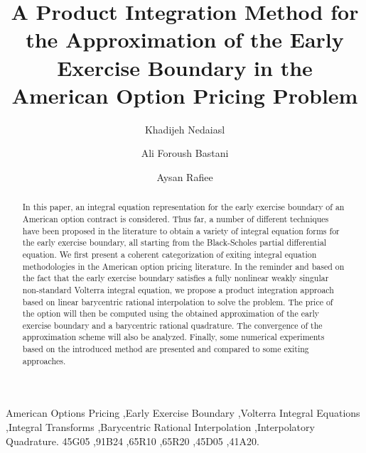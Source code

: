 \documentclass[fleqn,final,3p,11pt]{elsarticle}
\theoremstyle{definition}
\theoremstyle{remark}
\numberwithin{equation}{section}
\begin{document}
\begin{frontmatter}

\title{A Product Integration Method for the Approximation of the Early Exercise Boundary in the American Option Pricing Problem}

\author{Khadijeh Nedaiasl}


\author{Ali Foroush Bastani}

\author{Aysan Rafiee}
\address{Institute for Advanced Studies in Basic Sciences, Zanjan, Iran.}


\begin{abstract}
In this paper, an integral equation representation for the early exercise boundary of an American option contract is considered. Thus far, a number of different techniques have been proposed in the literature to obtain a variety of integral equation forms for the early exercise boundary, all starting from the Black-Scholes partial differential equation. We first present a coherent categorization of exiting integral equation methodologies in the American option pricing literature. In the reminder and based on the fact that the early exercise boundary satisfies a fully nonlinear weakly singular non-standard Volterra integral equation, we propose a product integration approach based on linear barycentric rational interpolation to solve the problem. The price of the option will then be computed using the obtained approximation of the early exercise boundary and a barycentric rational quadrature. The convergence of the approximation scheme will also be analyzed. Finally, some numerical experiments based on the introduced method are presented and compared to some exiting approaches.
\end{abstract}

\begin{keyword}
American Options Pricing \sep Early Exercise Boundary  \sep Volterra Integral Equations \sep   Integral Transforms \sep Barycentric Rational Interpolation \sep Interpolatory Quadrature.
\MSC[2010] 45G05 \sep  91B24 \sep 65R10 \sep 65R20 \sep 45D05 \sep 41A20.
\end{keyword}

\end{frontmatter}
\end{document}
